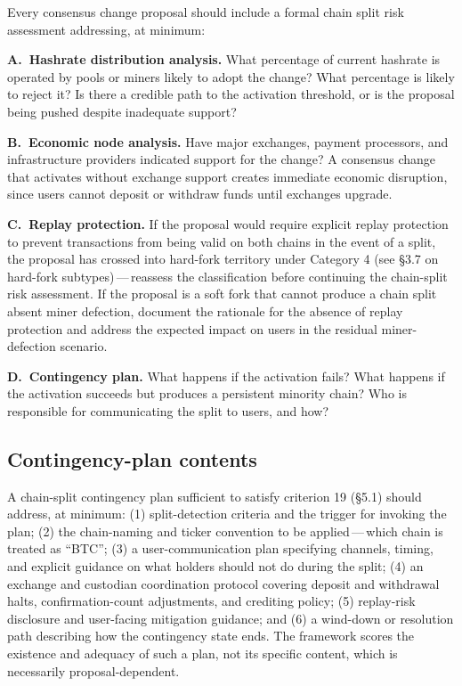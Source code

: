 \documentclass[11pt, twoside, openright]{book}
\newcommand{\reqitem}[2]{\medskip\noindent\textbf{#1\ #2}\quad\ignorespaces}
\newcommand{\sect}[1]{\S#1}
\begin{document}
Every consensus change proposal should include a formal chain split risk assessment addressing, at minimum:

\reqitem{A.}{Hashrate distribution analysis.} What percentage of current hashrate is operated by pools or miners likely to adopt the change? What percentage is likely to reject it? Is there a credible path to the activation threshold, or is the proposal being pushed despite inadequate support?

\reqitem{B.}{Economic node analysis.} Have major exchanges, payment processors, and infrastructure providers indicated support for the change? A consensus change that activates without exchange support creates immediate economic disruption, since users cannot deposit or withdraw funds until exchanges upgrade.

\reqitem{C.}{Replay protection.} If the proposal would require explicit replay protection to prevent transactions from being valid on both chains in the event of a split, the proposal has crossed into hard-fork territory under Category 4 (see \sect{3.7} on hard-fork subtypes)\,---\,reassess the classification before continuing the chain-split risk assessment. If the proposal is a soft fork that cannot produce a chain split absent miner defection, document the rationale for the absence of replay protection and address the expected impact on users in the residual miner-defection scenario.

\reqitem{D.}{Contingency plan.} What happens if the activation fails? What happens if the activation succeeds but produces a persistent minority chain? Who is responsible for communicating the split to users, and how?

\subsection*{Contingency-plan contents}

A chain-split contingency plan sufficient to satisfy criterion 19 (\sect{5.1}) should address, at minimum: (1) split-detection criteria and the trigger for invoking the plan; (2) the chain-naming and ticker convention to be applied\,---\,which chain is treated as ``BTC''; (3) a user-communication plan specifying channels, timing, and explicit guidance on what holders should not do during the split; (4) an exchange and custodian coordination protocol covering deposit and withdrawal halts, confirmation-count adjustments, and crediting policy; (5) replay-risk disclosure and user-facing mitigation guidance; and (6) a wind-down or resolution path describing how the contingency state ends. The framework scores the existence and adequacy of such a plan, not its specific content, which is necessarily proposal-dependent.
\end{document}
